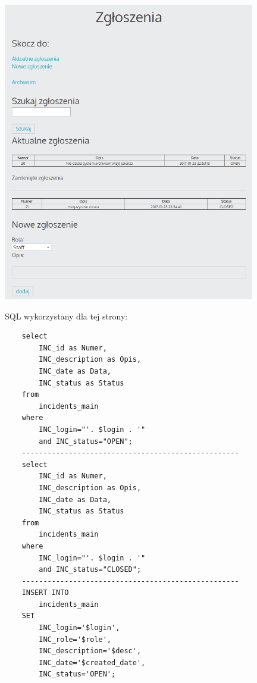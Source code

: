 \documentclass[10pt,a4paper]{article}
\begin{document}
	\includegraphics[width=11cm]{16}
	
	SQL wykorzystany dla tej strony:
	\begin{lstlisting}
	select 
		INC_id as Numer, 
		INC_description as Opis, 
		INC_date as Data, 
		INC_status as Status 
	from 
		incidents_main 
	where 
		INC_login="'. $login . '" 
		and INC_status="OPEN"; 
	---------------------------------------------------
	select 
		INC_id as Numer, 
		INC_description as Opis, 
		INC_date as Data, 
		INC_status as Status 
	from 
		incidents_main 
	where 
		INC_login="'. $login . '" 
		and INC_status="CLOSED"; 
	---------------------------------------------------
	INSERT INTO 
		incidents_main 
	SET 
		INC_login='$login', 
		INC_role='$role', 
		INC_description='$desc', 
		INC_date='$created_date', 
		INC_status='OPEN'; 
	
	
	\end{lstlisting}
\end{document}
